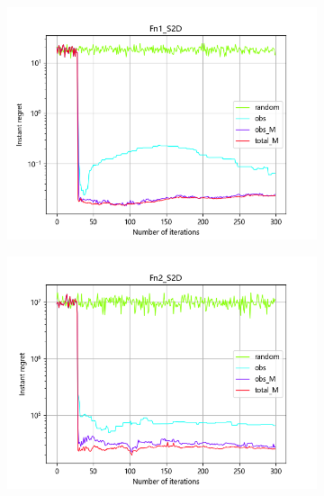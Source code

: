 \documentclass{article}
\begin{document}
\begin{figure}[H]
    \centering
    \begin{subfigure}[t]{.32\linewidth}
        \centering
        \includegraphics[width=1\textwidth]{pictures/Homo_noise_2D/S/Fn1_S2D_ins.png}
    \end{subfigure}
    \begin{subfigure}[t]{.32\linewidth}
        \centering
        \includegraphics[width=1\textwidth]{pictures/Homo_noise_2D/S/Fn2_S2D_ins.png}
    \end{subfigure}
    \begin{subfigure}[t]{.32\linewidth}
        \centering

\end{subfigure}
\end{figure}
\end{document}
